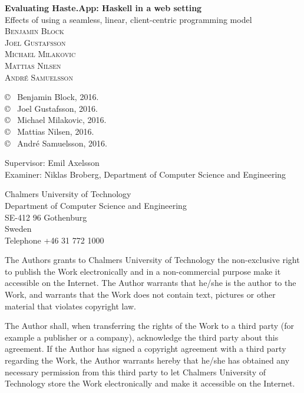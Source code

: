 \documentclass[a4paper]{article}
\begin{document}
\newpage
\thispagestyle{plain}

\textbf{Evaluating Haste.App: Haskell in a web setting}\\
Effects of using a seamless, linear, client-centric programming model\\

{ \textsc{Benjamin Block}} \setlength{\parskip}{2.9cm}\\
{ \textsc{Joel Gustafsson}} \setlength{\parskip}{2.9cm}\\
{ \textsc{Michael Milakovic}} \setlength{\parskip}{2.9cm}\\
{ \textsc{Mattias Nilsen}} \setlength{\parskip}{2.9cm}\\
{ \textsc{André Samuelsson}} \setlength{\parskip}{2.9cm}

\copyright ~ Benjamin Block, 2016. \setlength{\parskip}{1cm}\\
\copyright ~ Joel Gustafsson, 2016. \setlength{\parskip}{1cm}\\
\copyright ~ Michael Milakovic, 2016. \setlength{\parskip}{1cm}\\
\copyright ~ Mattias Nilsen, 2016. \setlength{\parskip}{1cm}\\
\copyright ~ André Samuelsson, 2016. \setlength{\parskip}{1cm}

Supervisor: Emil Axelsson\\
Examiner: Niklas Broberg, Department of Computer Science and Engineering\setlength{\parskip}{1cm}

Chalmers University of Technology\\
Department of Computer Science and Engineering\\
SE-412 96 Gothenburg\\
Sweden\\
Telephone +46 31 772 1000 \setlength{\parskip}{0.5cm}

\vfill

The Authors grants to Chalmers University of Technology the non-exclusive right to publish the Work electronically and in a non-commercial purpose make it accessible on the Internet. The Author warrants that he/she is the author to the Work, and warrants that the Work does not contain text, pictures or other material that violates copyright law.

The Author shall, when transferring the rights of the Work to a third party (for example a publisher or a company), acknowledge the third party about this agreement. If the Author has signed a copyright agreement with a third party regarding the Work, the Author warrants hereby that he/she has obtained any necessary permission from this third party to let Chalmers University of Technology store the Work electronically and make it accessible on the Internet.
\end{document}
